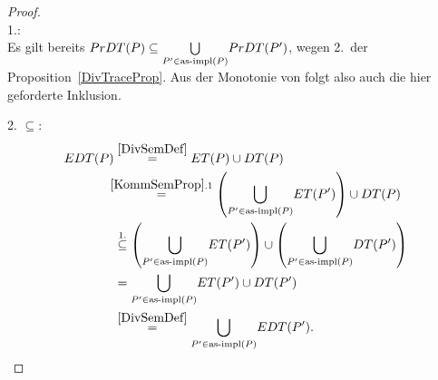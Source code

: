 \begin{proof}\mbox{}\\
  1.:\\
  Es gilt bereits $PrDT (P) \subseteq \underset{P'\in\mathrm{as}\text{-}\mathrm{impl} (P)}{\bigcup}
  PrDT (P')$, wegen 2.\ der Proposition~\ref{DivTraceProp}. Aus der Monotonie
  von \cont{} folgt also auch die hier geforderte Inklusion.

  2. \glqq$\subseteq$\grqq{}:
  {\allowdisplaybreaks
  \begin{align*}
    \EDT (P)&\overset{\ref{DivSemDef}}{=} \ET (P)\cup \DT (P)\\
    &\hspace{-0.2cm}\overset{\ref{KommSemProp}.1}{=} \left(\underset{P'\in
    \asimp (P)}{\bigcup} \ET (P')\right)\cup \DT (P)\\
    &\overset{1.}{\subseteq} \left(\underset{P'\in
    \asimp (P)}{\bigcup} \ET (P')\right)\cup \left(\underset{P'\in \asimp
    (P)}{\bigcup} \DT (P')\right)\\
    &= \underset{P'\in \asimp (P)}{\bigcup} \ET (P') \cup \DT (P')\\
    &\overset{\ref{DivSemDef}}{=} \underset{P'\in\asimp (P)}{\bigcup} \EDT
    (P').
  \end{align*}}


\end{proof}
